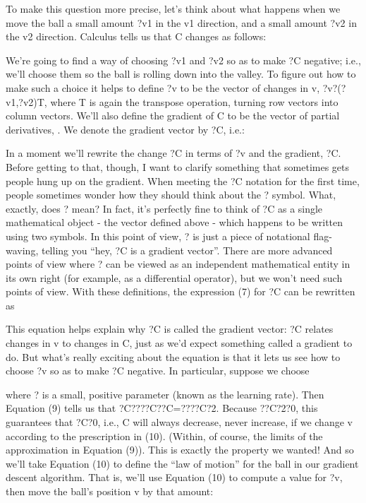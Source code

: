 To make this question more precise, let's think about what happens when we move the ball a small amount ?v1 in the v1 direction, and a small amount ?v2 in the v2 direction. Calculus tells us that C changes as follows: 

We're going to find a way of choosing ?v1 and ?v2 so as to make ?C negative; i.e., we'll choose them so the ball is rolling down into the valley. To figure out how to make such a choice it helps to define ?v to be the vector of changes in v, ?v?(?v1,?v2)T, where T is again the transpose operation, turning row vectors into column vectors. We'll also define the gradient of C to be the vector of partial derivatives, . We denote the gradient vector by ?C, i.e.: 

In a moment we'll rewrite the change ?C in terms of ?v and the gradient, ?C. Before getting to that, though, I want to clarify something that sometimes gets people hung up on the gradient. When meeting the ?C notation for the first time, people sometimes wonder how they should think about the ? symbol. What, exactly, does ? mean? In fact, it's perfectly fine to think of ?C as a single mathematical object - the vector defined above - which happens to be written using two symbols. In this point of view, ? is just a piece of notational flag-waving, telling you ``hey, ?C is a gradient vector''. There are more advanced points of view where ? can be viewed as an independent mathematical entity in its own right (for example, as a differential operator), but we won't need such points of view.
With these definitions, the expression (7) for ?C can be rewritten as 

This equation helps explain why ?C is called the gradient vector: ?C relates changes in v to changes in C, just as we'd expect something called a gradient to do. But what's really exciting about the equation is that it lets us see how to choose ?v so as to make ?C negative. In particular, suppose we choose 

where ? is a small, positive parameter (known as the learning rate). Then Equation (9) tells us that ?C????C??C=????C?2. Because ??C?2?0, this guarantees that ?C?0, i.e., C will always decrease, never increase, if we change v according to the prescription in (10). (Within, of course, the limits of the approximation in Equation (9)). This is exactly the property we wanted! And so we'll take Equation (10) to define the ``law of motion'' for the ball in our gradient descent algorithm. That is, we'll use Equation (10) to compute a value for ?v, then move the ball's position v by that amount: 

